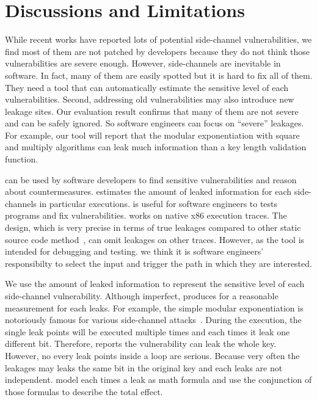 \section{Discussions and Limitations}
While recent works have reported lots
of potential side-channel vulnerabilities, we find most of them are not patched by
developers because they do not think those vulnerabilities are severe enough.
However, side-channels are inevitable in software. In fact, many of them
are easily spotted but it is hard to fix all of them. They need a
tool that can automatically estimate the sensitive level of each vulnerabilities.
Second, addressing old vulnerabilities may also introduce new leakage
sites. Our evaluation result confirms that many of them are not 
severe and can be safely ignored. So software engineers can focus on
``severe'' leakages. For example, our tool will report that 
the modular exponentiation with square and multiply algorithms can
leak much information than a key length validation function.

\tool{} can be used by software developers to find sensitive vulnerabilities
and reason about countermeasures.
\tool{} estimates the amount of leaked information for each side-channels
in particular executions. \tool{} is useful for software
engineers to tests programs and fix vulnerabilities.
\tool{} works on native x86 execution traces. The design, which is very
precise in terms of true leakages compared to other static source code
method~\cite{197207,BacelarAlmeida:2013:FVS:2483313.2483334}, can omit
leakages on other traces. However, as the tool is intended for debugging and testing.
we think it is software engineers' responsibilty to select the input and trigger the 
path in which they are interested.

We use the amount of leaked information to represent the sensitive level of each
side-channel vulnerability. Although imperfect, \tool{} produces for a reasonable
measurement for each leaks. For example, the simple modular exponentiation is notoriously
famous for various side-channel attacks~\cite{kocher1996timing}. During the execution, the single 
leak points will be executed multiple times and each times it leak one different bit.
Therefore, \tool{} reports the vulnerability can leak the whole key. However, no every
leak points inside a loop are serious. Because very often the leakages may leaks the same
bit in the original key and each leaks are not independent. \tool{} model each times a leak
as math formula and use the conjunction of those formulas to describe the total effect.

